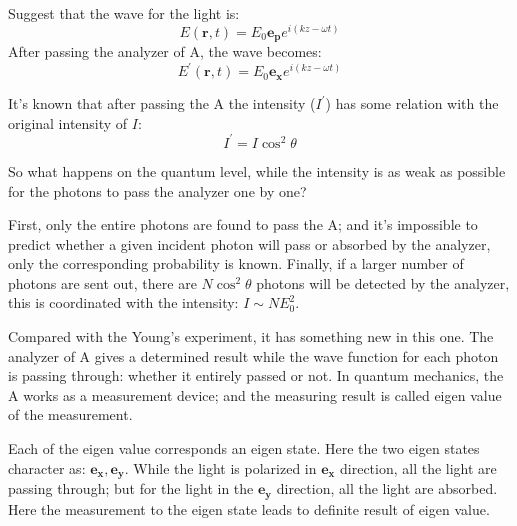 Suggest that the wave for the light is:
\begin{equation}\label{}
E(\bm{r},t) = E_{0}\bm{e_{p}}e^{i(kz-\omega t )}
\end{equation}
After passing the analyzer of A, the wave becomes:
\begin{equation}\label{}
E^{'}(\bm{r},t) = E_{0}\bm{e_{x}}e^{i(kz-\omega t )}
\end{equation}

It's known that after passing the A the intensity ($I^{'}$) has some
relation with the original intensity of $I$:
\begin{equation}\label{}
I^{'} = I \cos^{2}\theta
\end{equation}

So what happens on the quantum level, while the intensity is as weak
as possible for the photons to pass the analyzer one by one?

First, only the entire photons are found to pass the A; and it's
impossible to predict whether a given incident photon will pass or
absorbed by the analyzer, only the corresponding probability is
known. Finally, if a larger number of photons are sent out, there
are $N\cos^{2}\theta$ photons will be detected by the analyzer, this
is coordinated with the intensity: $I \sim NE^{2}_{0}$.

Compared with the Young's experiment, it has something new in this
one. The analyzer of A gives a determined result while the wave
function for each photon is passing through: whether it entirely
passed or not. In quantum mechanics, the A works as a measurement
device; and the measuring result is called eigen value of the
measurement.

Each of the eigen value corresponds an eigen state. Here the two
eigen states character as: $\bm{e_{x}}, \bm{e_{y}}$. While the light
is polarized in $\bm{e_{x}}$ direction, all the light are passing
through; but for the light in the $\bm{e_{y}}$ direction, all the
light are absorbed. Here the measurement to the eigen state leads to
definite result of eigen value.

